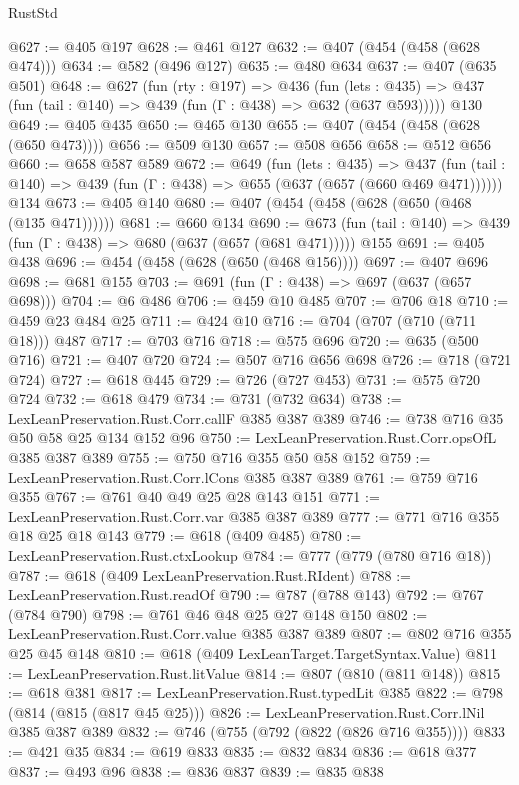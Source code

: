 \begin{lexlean}{RustStd}
\begin{coremodule}
@627 := @405 @197
@628 := @461 @127
@632 := @407 (@454 (@458 (@628 @474)))
@634 := @582 (@496 @127)
@635 := @480 @634
@637 := @407 (@635 @501)
@648 := @627
    (fun (rty : @197) =>
    @436
      (fun (lets : @435) => @437 (fun (tail : @140) => @439 (fun (Γ : @438) => @632 (@637 @593)))))
    @130
@649 := @405 @435
@650 := @465 @130
@655 := @407 (@454 (@458 (@628 (@650 @473))))
@656 := @509 @130
@657 := @508 @656
@658 := @512 @656
@660 := @658 @587 @589
@672 := @649
    (fun (lets : @435) =>
    @437 (fun (tail : @140) => @439 (fun (Γ : @438) => @655 (@637 (@657 (@660 @469 @471))))))
    @134
@673 := @405 @140
@680 := @407 (@454 (@458 (@628 (@650 (@468 (@135 @471))))))
@681 := @660 @134
@690 := @673 (fun (tail : @140) => @439 (fun (Γ : @438) => @680 (@637 (@657 (@681 @471))))) @155
@691 := @405 @438
@696 := @454 (@458 (@628 (@650 (@468 @156))))
@697 := @407 @696
@698 := @681 @155
@703 := @691 (fun (Γ : @438) => @697 (@637 (@657 @698)))
@704 := @6 @486
@706 := @459 @10 @485
@707 := @706 @18
@710 := @459 @23 @484 @25
@711 := @424 @10
@716 := @704 (@707 (@710 (@711 @18))) @487
@717 := @703 @716
@718 := @575 @696
@720 := @635 (@500 @716)
@721 := @407 @720
@724 := @507 @716 @656 @698
@726 := @718 (@721 @724)
@727 := @618 @445
@729 := @726 (@727 @453)
@731 := @575 @720 @724
@732 := @618 @479
@734 := @731 (@732 @634)
@738 := LexLeanPreservation.Rust.Corr.callF @385 @387 @389
@746 := @738 @716 @35 @50 @58 @25 @134 @152 @96
@750 := LexLeanPreservation.Rust.Corr.opsOfL @385 @387 @389
@755 := @750 @716 @355 @50 @58 @152
@759 := LexLeanPreservation.Rust.Corr.lCons @385 @387 @389
@761 := @759 @716 @355
@767 := @761 @40 @49 @25 @28 @143 @151
@771 := LexLeanPreservation.Rust.Corr.var @385 @387 @389
@777 := @771 @716 @355 @18 @25 @18 @143
@779 := @618 (@409 @485)
@780 := LexLeanPreservation.Rust.ctxLookup
@784 := @777 (@779 (@780 @716 @18))
@787 := @618 (@409 LexLeanPreservation.Rust.RIdent)
@788 := LexLeanPreservation.Rust.readOf
@790 := @787 (@788 @143)
@792 := @767 (@784 @790)
@798 := @761 @46 @48 @25 @27 @148 @150
@802 := LexLeanPreservation.Rust.Corr.value @385 @387 @389
@807 := @802 @716 @355 @25 @45 @148
@810 := @618 (@409 LexLeanTarget.TargetSyntax.Value)
@811 := LexLeanPreservation.Rust.litValue
@814 := @807 (@810 (@811 @148))
@815 := @618 @381
@817 := LexLeanPreservation.Rust.typedLit @385
@822 := @798 (@814 (@815 (@817 @45 @25)))
@826 := LexLeanPreservation.Rust.Corr.lNil @385 @387 @389
@832 := @746 (@755 (@792 (@822 (@826 @716 @355))))
@833 := @421 @35
@834 := @619 @833
@835 := @832 @834
@836 := @618 @377
@837 := @493 @96
@838 := @836 @837
@839 := @835 @838

\end{coremodule}
\end{lexlean}
